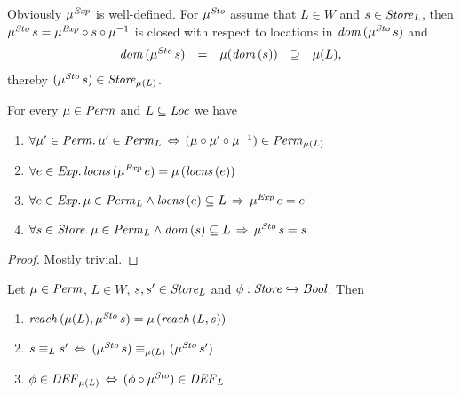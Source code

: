 \documentclass[12pt,a4paper]{report}
\newcommand{\Sto}{\nstyle{Sto}}
\newcommand{\DEF}{\nstyle{DEF}}
\begin{document}
Obviously $\mu^{\mathit{Exp}}$ is well-defined. For $\mu^\Sto$ assume that $L \in W$ and $s\in\mathit{Store}_L$,
then $\mu^\Sto\,s = \mu^\Exp \circ s \circ \mu^{-1}$ is closed with respect to locations in
$\dom{\mu^\Sto\,s}$ and
\[\begin{array}{rccccl}
  \dom{\mu^\Sto\,s} &=& \mu(\dom{s}) &\supseteq& \mu(L),
\end{array}\]
thereby $(\mu^\Sto\,s) \in \Store_{\mu(L)}$.

\begin{lemma}[Permutations] \label{lemma:Permutations}
  For every $\mu\in\mathit{Perm}$ and $L\subseteq \mathit{Loc}$ we have
  \begin{enumerate}
    \item $\forall \mu'\in\mathit{Perm}.\,\mu'\in\mathit{Perm}_L \,\Leftrightarrow\, (\mu \circ \mu' \circ \mu^{-1})\in\mathit{Perm}_{\mu(L)}$
    \item $\forall e\in\mathit{Exp}.\,\mathit{locns}\,(\mu^{\mathit{Exp}}\,e) = \mu\,(\mathit{locns}\,(e))$
    \item $\forall e\in\mathit{Exp}.\,\mu\in\mathit{Perm}_L\wedge\mathit{locns}\,(e) \subseteq L \,\Rightarrow\, \mu^{\mathit{Exp}}\,e = e$
    \item $\forall s\in\Store.\,\mu\in\Perm_L\wedge\dom{s} \subseteq L \,\Rightarrow\, \mu^\Sto\,s = s$
  \end{enumerate}
\end{lemma}

\begin{proof}
  Mostly trivial.
\end{proof}

\begin{lemma} \label{lemma:Permutations_and_Reachability}
  Let $\mu \in \mathit{Perm}$, $L \in W$, $s,s'\in\mathit{Store}_L$ and $\phi:\mathit{Store}\hookrightarrow\mathit{Bool}$.
  Then
  \begin{enumerate}
    \item $\reach{\mu(L)}{\mu^\Sto\,s} = \mu\,(\reach{L}{s})$
    \item $s \equiv_L s' \,\Leftrightarrow\, (\mu^\Sto\,s) \equiv_{\mu(L)} (\mu^\Sto\,s')$
    \item $\phi \in \DEF_{\mu(L)} \,\Leftrightarrow\, (\phi \circ \mu^\Sto) \in \DEF_L$
  \end{enumerate}
\end{lemma}
\end{document}
